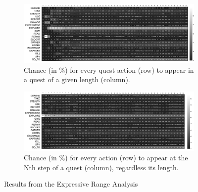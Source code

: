 


\begin{figure}[t]
    \centering
    \begin{subfigure}[t]{0.9\textwidth}
        \centering
        \includegraphics[width=1\textwidth]{included-papers-tex/paper-8/figures/perLengthExperiment-an.png}
        \caption{Chance (in \%) for every quest action (row) to appear in a quest of a given length (column).}
        \label{figs:evaluation:length}
    \end{subfigure} \hfill%
    \begin{subfigure}[t]{0.9\textwidth}
        \centering
         \includegraphics[width=1\textwidth]{included-papers-tex/paper-8/figures/perStepsExperiment-an.png}
        \caption{Chance (in \%) for every action (row) to appear at the Nth step of a quest (column), regardless its length.}
        \label{figs:evaluation:steps}
    \end{subfigure}
    \caption{Results from the Expressive Range Analysis}
    \label{figs:Experiments}
\end{figure}

